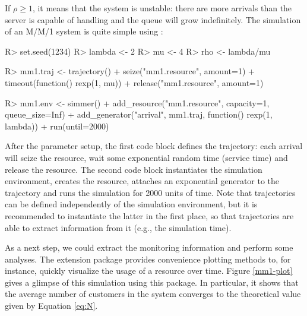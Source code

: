\documentclass[
  nojss]{jss}
\begin{document}
If \(\rho \ge 1\), it means that the system is unstable: there are more
arrivals than the server is capable of handling and the queue will grow
indefinitely. The simulation of an M/M/1 system is quite simple using
:

\begin{CodeChunk}
\begin{CodeInput}
R> set.seed(1234)
R> lambda <- 2
R> mu <- 4
R> rho <- lambda/mu
\end{CodeInput}
\end{CodeChunk}

\begin{CodeChunk}
\begin{CodeInput}
R> mm1.traj <- trajectory() %
+   seize("mm1.resource", amount=1) %
+   timeout(function() rexp(1, mu)) %
+   release("mm1.resource", amount=1)
\end{CodeInput}
\end{CodeChunk}

\begin{CodeChunk}
\begin{CodeInput}
R> mm1.env <- simmer() %
+   add_resource("mm1.resource", capacity=1, queue_size=Inf) %
+   add_generator("arrival", mm1.traj, function() rexp(1, lambda)) %
+   run(until=2000)
\end{CodeInput}
\end{CodeChunk}

After the parameter setup, the first code block defines the trajectory:
each arrival will seize the resource, wait some exponential random time
(service time) and release the resource. The second code block
instantiates the simulation environment, creates the resource, attaches
an exponential generator to the trajectory and runs the simulation for
2000 units of time. Note that trajectories can be defined independently
of the simulation environment, but it is recommended to instantiate the
latter in the first place, so that trajectories are able to extract
information from it (e.g., the simulation time).

As a next step, we could extract the monitoring information and perform
some analyses. The extension package 
\citep{CRAN:simmer.plot} provides convenience plotting methods to, for
instance, quickly visualize the usage of a resource over time. Figure
\ref{mm1-plot} gives a glimpse of this simulation using this package. In
particular, it shows that the average number of customers in the system
converges to the theoretical value given by Equation \ref{eq:N}.
\end{document}
